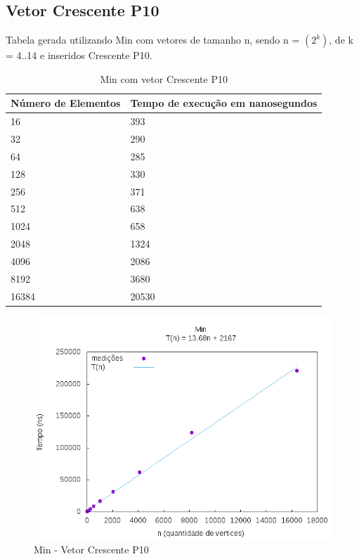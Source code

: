 \documentclass[12pt,a4paper,twoside]{report}
\begin{document}
\subsection{Vetor Crescente P10}
Tabela gerada utilizando Min com vetores de tamanho n, sendo n = $(2^k)$, de k = 4..14 e inseridos Crescente P10.
\begin{table}[H]
\centering
\caption{Min com vetor Crescente P10}
\label{my-label}
\begin{tabular}{|l|l|}
\hline
\multicolumn{1}{|c|}{\textbf{Número de Elementos}} & \multicolumn{1}{c|}{\textbf{Tempo de execução em nanosegundos}} \\ \hline
16 & 393 \\ \hline
32 & 290 \\ \hline
64 & 285 \\ \hline
128 & 330 \\ \hline
256 & 371 \\ \hline
512 & 638 \\ \hline
1024 & 658 \\ \hline
2048 & 1324 \\ \hline
4096 & 2086 \\ \hline
8192 & 3680 \\ \hline
16384 & 20530 \\ \hline

\end{tabular}
\end{table}

\begin{figure}[H]
    \centering
    \includegraphics[width=0.7\linewidth]{graficos/Min/Crescente P10/Min.png}
  \caption{Min - Vetor Crescente P10}
\end{figure}
\end{document}
